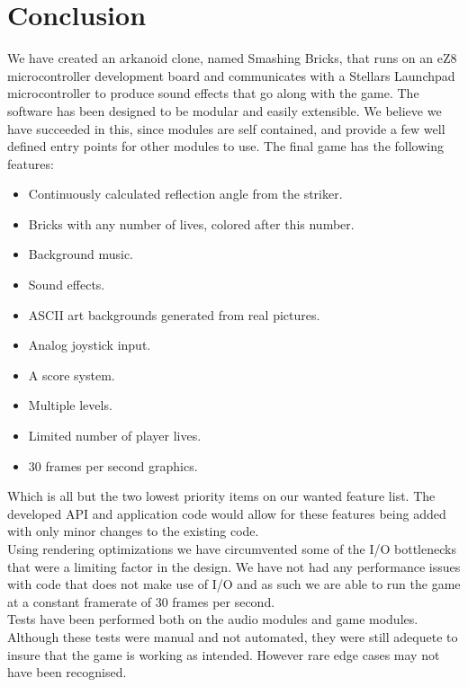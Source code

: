 \section{Conclusion}
We have created an arkanoid clone, named Smashing Bricks, that runs on an eZ8 microcontroller
 development board and communicates with a Stellars Launchpad microcontroller to produce sound effects
that go along with the game. The software has been designed to be modular and
easily extensible. We believe we have succeeded in this, since modules are self contained, 
and provide a few well defined entry points for other modules to use. The final game has
the following features:
\begin{itemize}
	\item Continuously calculated reflection angle from the striker.
	\item Bricks with any number of lives, colored after this number.
	\item Background music.
	\item Sound effects.
	\item ASCII art backgrounds generated from real pictures.
	\item Analog joystick input.
	\item A score system.
	\item Multiple levels.
	\item Limited number of player lives.
	\item 30 frames per second graphics.
\end{itemize}
Which is all but the two lowest priority items on our wanted feature list. The developed API and application code
would allow for these features being added with only minor changes to the existing code. \\

Using rendering optimizations we have circumvented some of the I/O bottlenecks that were a limiting factor in the
design. We have not had any performance issues with code that does not make use of I/O and as such we are
able to run the game at a constant framerate of 30 frames per second. \\

Tests have been performed both on the audio modules and game modules. Although these tests were manual and
not automated, they were still adequete to insure that the game is working as intended. However rare
edge cases may not have been recognised.

